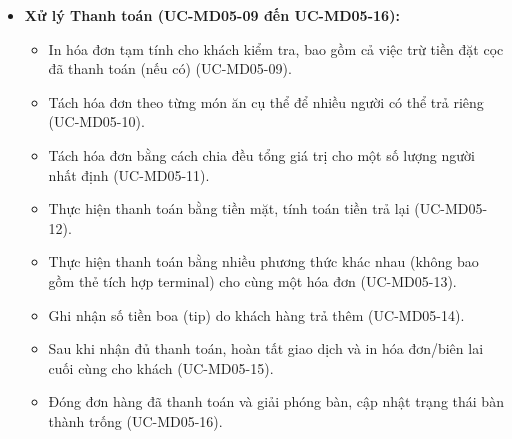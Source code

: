 \begin{itemize}
    \item \textbf{Xử lý Thanh toán (UC-MD05-09 đến UC-MD05-16):}
    \begin{itemize}
        \item In hóa đơn tạm tính cho khách kiểm tra, bao gồm cả việc trừ tiền đặt cọc đã thanh toán (nếu có) (UC-MD05-09).
        \item Tách hóa đơn theo từng món ăn cụ thể để nhiều người có thể trả riêng (UC-MD05-10).
        \item Tách hóa đơn bằng cách chia đều tổng giá trị cho một số lượng người nhất định (UC-MD05-11).
        \item Thực hiện thanh toán bằng tiền mặt, tính toán tiền trả lại (UC-MD05-12).
        \item Thực hiện thanh toán bằng nhiều phương thức khác nhau (không bao gồm thẻ tích hợp terminal) cho cùng một hóa đơn (UC-MD05-13).
        \item Ghi nhận số tiền boa (tip) do khách hàng trả thêm (UC-MD05-14).
        \item Sau khi nhận đủ thanh toán, hoàn tất giao dịch và in hóa đơn/biên lai cuối cùng cho khách (UC-MD05-15).
        \item Đóng đơn hàng đã thanh toán và giải phóng bàn, cập nhật trạng thái bàn thành trống (UC-MD05-16).
    \end{itemize}
\end{itemize}

